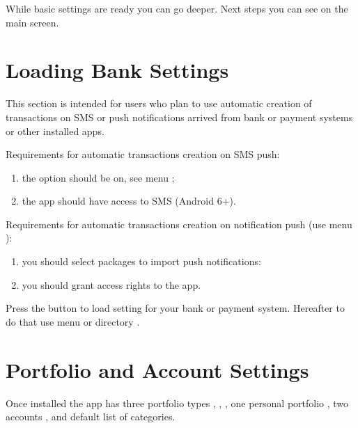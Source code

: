 \documentclass[a4paper,10pt,english]{sphinxmanual}
\begin{document}
While basic settings are ready you can go deeper. Next steps you can see on the main screen.


\section{Loading Bank Settings}
\label{\detokenize{getting-started:loading-bank-settings}}
This section is intended for users who plan to use automatic creation of transactions on SMS or push notifications arrived
from bank or payment systems or other installed apps.

Requirements for automatic transactions creation on SMS push:
\begin{enumerate}
\def\theenumi{\arabic{enumi}}
\def\labelenumi{\theenumi .}
\makeatletter\def\p@enumii{\p@enumi \theenumi .}\makeatother
\item {} 
the option should be on, see menu ;

\item {} 
the app should have access to SMS (Android 6+).

\end{enumerate}

Requirements for automatic transactions creation on notification push (use menu ):
\begin{enumerate}
\def\theenumi{\arabic{enumi}}
\def\labelenumi{\theenumi .}
\makeatletter\def\p@enumii{\p@enumi \theenumi .}\makeatother
\item {} 
you should select packages to import push notifications:

\item {} 
you should grant access rights to the app.

\end{enumerate}

Press the button  to load setting for your bank or payment system. Hereafter
to do that use menu  or directory
.

\noindent{}
\noindent{}


\section{Portfolio and Account Settings}
\label{\detokenize{getting-started:portfolio-and-account-settings}}
Once installed the app has three portfolio types , , ,
one personal portfolio , two accounts ,  and default list of categories.
\end{document}
